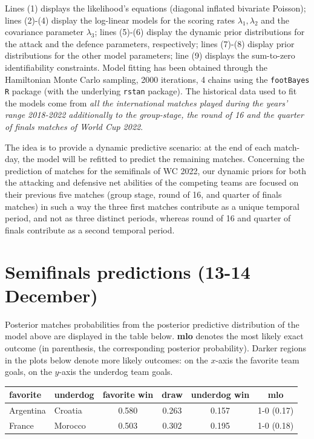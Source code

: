 \documentclass[
  10pt,
]{article}
\begin{document}
Lines (1) displays the likelihood's equations (diagonal inflated
bivariate Poisson); lines (2)-(4) display the log-linear models for the
scoring rates \(\lambda_{1}, \lambda_{2}\) and the covariance parameter
\(\lambda_3\); lines (5)-(6) display the dynamic prior distributions for
the attack and the defence parameters, respectively; lines (7)-(8)
display prior distributions for the other model parameters; line (9)
displays the sum-to-zero identifiability constraints. Model fitting has
been obtained through the Hamiltonian Monte Carlo sampling, 2000
iterations, 4 chains using the \texttt{footBayes} \texttt{R} package
(with the underlying \texttt{rstan} package). The historical data used
to fit the models come from \emph{all the international matches played
during the years' range 2018-2022 additionally to the group-stage, the
round of 16 and the quarter of finals matches of World Cup 2022}.

The idea is to provide a dynamic predictive scenario: at the end of each
match-day, the model will be refitted to predict the remaining matches.
Concerning the prediction of matches for the semifinals of WC 2022, our
dynamic priors for both the attacking and defensive net abilities of the
competing teams are focused on their previous five matches (group stage, round of 16, and quarter of finals matches) in such a way the three first matches
contribute as a unique temporal period, and not as three distinct
periods, whereas round of 16 and quarter of finals contribute as a second temporal period. 

\hypertarget{semifinals-predictions-13-14-december}{%
\section{Semifinals predictions (13-14
December)}\label{semifinals-predictions-13-14-december}}

Posterior matches probabilities from the posterior predictive
distribution of the model above are displayed in the table below.
\textbf{mlo} denotes the most likely exact outcome (in parenthesis, the
corresponding posterior probability). Darker regions in the plots below
denote more likely outcomes: on the \(x\)-axis the favorite team goals, on the
\(y\)-axis the underdog team goals.

\begin{longtable}[]{@{}llcccc@{}}
\toprule
favorite & underdog & favorite win & draw & underdog win & mlo \\
\midrule
\endhead
Argentina & Croatia & 0.580 & 0.263 & 0.157 & 1-0 (0.17) \\
France & Morocco & 0.503 & 0.302 & 0.195 & 1-0 (0.18) \\
\bottomrule
\end{longtable}
\end{document}
